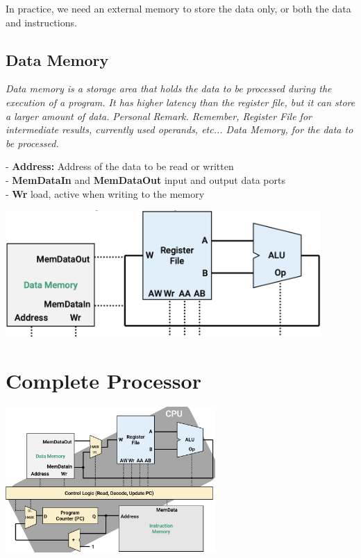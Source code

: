 \documentclass[12pt,openany]{book}
\begin{document}
In practice, we need an external memory to store the data only, or both the data and instructions.
\subsection{Data Memory}
\textit{Data memory is a storage area that holds the data to be processed during the execution of a program. It has higher latency than the register file, but it can store a larger amount of data.} \newline
\textit{Personal Remark. Remember, Register File for intermediate results, currently used operands, etc... Data Memory, for the data to be processed.}
\newline
\begin{minipage}[htp]{0.4\textwidth}
- \textbf{Address:} Address of the data to be read or written \\
\vspace*{3px}
- \textbf{MemDataIn} and \textbf{MemDataOut} input and output data ports \\
\vspace*{3px}
- \textbf{Wr} load, active when writing to the memory
\end{minipage}
\hfill
\vline
\hfill
\begin{minipage}[htp]{0.5\textwidth}
	\begin{center}
		\includegraphics[width=0.9\textwidth]{circuits/19.5.1.png}
	\end{center}
\end{minipage}
\section{Complete Processor}
\begin{center}
	\includegraphics[width=0.6\textwidth]{circuits/19.6.png}
\end{center}
\end{document}
